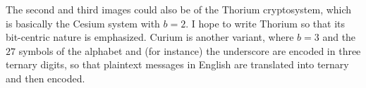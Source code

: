 \documentclass{article}
\begin{document}
{{The second and third images could also be of the Thorium cryptosystem, which is basically the Cesium system with $b = 2$. I hope to write Thorium so that its bit-centric nature is emphasized. Curium is another variant, where $b = 3$ and the $27$ symbols of the alphabet and (for instance) the underscore are encoded in three ternary digits, so that plaintext messages in English are translated into ternary and then encoded. 



}}
\end{document}
